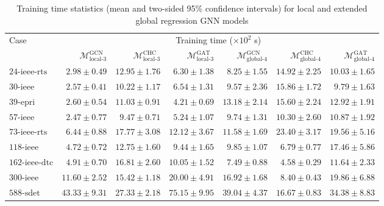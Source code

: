 \documentclass[journal]{IEEEtran}
\begin{document}
\begin{table*}[!ht]
\small
\caption{Training time statistics (mean and two-sided 95\% confidence intervals) for local and extended global regression GNN models}
\label{tab:train_times_reg_local}
\def\na{---}
\centering
    \begin{tabular}{lrrr|rrr}
    \toprule
    \multirow{2}{*}{Case} & \multicolumn{6}{c}{Training time ($\times 10^{2}$ s)} \\
    \cmidrule(r){2-7}
    & 
    $\mathcal{M}^{\textrm{GCN}}_{\textrm{local-3}}$ & $\mathcal{M}^{\textrm{CHC}}_{\textrm{local-3}}$ & $\mathcal{M}^{\textrm{GAT}}_{\textrm{local-3}}$ & $\mathcal{M}^{\textrm{GCN}}_{\textrm{global-4}}$ & $\mathcal{M}^{\textrm{CHC}}_{\textrm{global-4}}$ & $\mathcal{M}^{\textrm{GAT}}_{\textrm{global-4}}$ \\
    \midrule
    $\textrm{24-ieee-rts}$ & ${2.98} \pm {0.49}$ & $12.95 \pm 1.76$ & $6.30 \pm 1.38$ & ${8.25} \pm {1.55}$ & $14.92 \pm 2.25$ & $10.03 \pm 1.65$ \\
    $\textrm{30-ieee}$ & ${2.57} \pm {0.41}$ & $10.22 \pm 1.17$ & $6.54 \pm 1.31$ & ${9.57} \pm {2.36}$ & $15.86 \pm 1.72$ & $9.79 \pm 1.63$ \\
    $\textrm{39-epri}$ & ${2.60} \pm {0.54}$ & $11.03 \pm 0.91$ & $4.21 \pm 0.69$ & $13.18 \pm 2.14$ & $15.60 \pm 2.24$ & ${12.92} \pm {1.91}$ \\
    $\textrm{57-ieee}$ & ${2.47} \pm {0.77}$ & $9.47 \pm 0.71$ & $5.24 \pm 1.07$ & ${9.74} \pm {1.31}$ & $10.30 \pm 2.60$ & $10.87 \pm 1.92$ \\
    $\textrm{73-ieee-rts}$ & ${6.44} \pm {0.88}$ & $17.77 \pm 3.08$ & $12.12 \pm 3.67$ & ${11.58} \pm {1.69}$ & $23.40 \pm 3.17$ & $19.56 \pm 5.16$ \\
    $\textrm{118-ieee}$ & ${4.72} \pm {0.72}$ & $12.75 \pm 1.60$ & $9.44 \pm 1.65$ & $9.85 \pm 1.07$ & ${6.79} \pm {0.77}$ & $17.46 \pm 5.86$ \\
    $\textrm{162-ieee-dtc}$ & ${4.91} \pm {0.70}$ & $16.81 \pm 2.60$ & $10.05 \pm 1.52$ & $7.49 \pm 0.88$ & ${4.58} \pm {0.29}$ & $11.64 \pm 2.33$ \\
    $\textrm{300-ieee}$ & ${11.60} \pm {2.52}$ & $15.42 \pm 1.18$ & $20.00 \pm 4.91$ & $16.92 \pm 1.68$ & ${8.40} \pm {0.43}$ & $19.86 \pm 6.88$ \\
    $\textrm{588-sdet}$ & $43.33 \pm 9.31$ & ${27.33} \pm {2.18}$ & $75.15 \pm 9.95$ & $39.04 \pm 4.37$ & ${16.67} \pm {0.83}$ & $34.38 \pm 8.83$ \\
    \bottomrule
    \end{tabular}
\end{table*}
\end{document}
